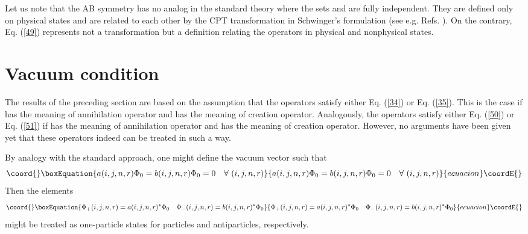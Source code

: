 \documentclass[a4paper,12pt]{article}%
\begin{document}
Let us note that the AB symmetry has no analog in the standard
theory where the sets \coordHE{} and \coordHE{} are fully 
independent. They are defined only on physical states and 
are related to each other by the CPT transformation in 
Schwinger's formulation (see e.g. Refs. \cite{Novozhilov,Wein}).  
On the contrary, Eq. (\ref{49}) represents not a 
transformation but a definition relating the operators 
in physical and nonphysical states.

\section{Vacuum condition}
\label{S7}

The results of the preceding section are based on the
assumption that the \coordHE{} operators satisfy either
Eq. (\ref{34}) or Eq. (\ref{35}). This is the case if
\coordHE{} has the meaning of annihilation operator and \coordHE{}
has the meaning of creation operator. Analogously, the
\coordHE{} operators satisfy either Eq. (\ref{50}) or 
Eq. (\ref{51}) if \coordHE{} has the meaning of annihilation 
operator and \coordHE{} has the meaning of creation operator.
However, no arguments have been given yet that
these operators indeed can be treated in such a way. 

By analogy with the standard approach, one
might define the vacuum vector \coordHE{} such
that 
\begin{equation}\coord{}\boxEquation{
a(i,j,n,r)\Phi_0=b(i,j,n,r)\Phi_0=0\quad 
\forall\,\, (i,j,n,r) 
\label{56}
}{
a(i,j,n,r)\Phi_0=b(i,j,n,r)\Phi_0=0\quad 
\forall\,\, (i,j,n,r) 
}{ecuacion}\coordE{}\end{equation}
Then the elements 
\begin{equation}\coord{}\boxEquation{
\Phi_+(i,j,n,r)=a(i,j,n,r)^*\Phi_0\quad
\Phi_-(i,j,n,r)=b(i,j,n,r)^*\Phi_0
\label{57}
}{
\Phi_+(i,j,n,r)=a(i,j,n,r)^*\Phi_0\quad
\Phi_-(i,j,n,r)=b(i,j,n,r)^*\Phi_0
}{ecuacion}\coordE{}\end{equation}
might be treated as one-particle states for particles 
and antiparticles, respectively. 
\end{document}
